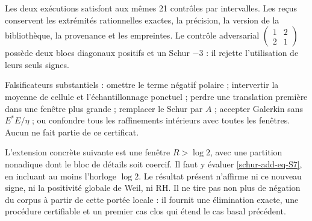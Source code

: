 
Les deux exécutions satisfont aux mêmes 21 contrôles par intervalles.
Les reçus conservent les extrémités rationnelles exactes, la précision, la version
de la bibliothèque, la provenance et les empreintes. Le contrôle adversarial
\(\begin{pmatrix}1&2\\2&1\end{pmatrix}\) possède deux blocs
diagonaux positifs et un Schur \(-3\) : il rejette l'utilisation de leurs seuls signes.

Falsificateurs substantiels : omettre le terme négatif polaire ; intervertir la moyenne
de cellule et l'échantillonnage ponctuel ; perdre une translation première dans une
fenêtre plus grande ; remplacer le Schur par \(A\) ; accepter Galerkin sans
\(E^*E/\eta\) ; ou confondre tous les raffinements intérieurs avec
toutes les fenêtres. Aucun ne fait partie de ce certificat.

L'extension concrète suivante est une fenêtre \(R>\log2\), avec
une partition nonadique dont le bloc de détails soit coercif. Il faut y
évaluer \eqref{schur-add-eq-S7}, en incluant au moins l'horloge \(\log2\).
Le résultat présent n'affirme ni ce nouveau signe, ni la positivité
globale de Weil, ni RH. Il ne tire pas non plus de négation du corpus à partir
de cette portée locale : il fournit une élimination exacte, une procédure
certifiable et un premier cas clos qui étend le cas basal précédent.

